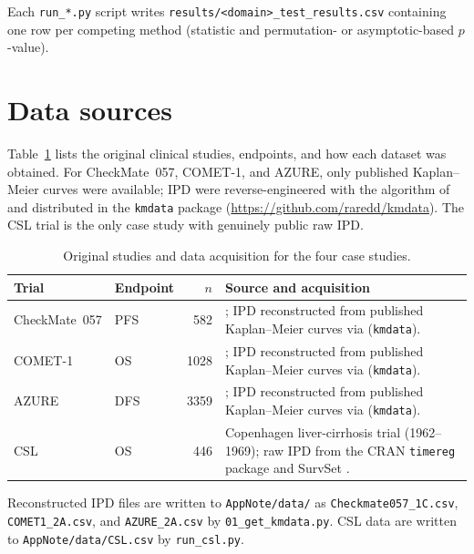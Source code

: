 \documentclass[11pt]{article}
\begin{document}
Each \texttt{run\_*.py} script writes
\texttt{results/<domain>\_test\_results.csv} containing one row per
competing method (statistic and permutation- or asymptotic-based
$p$-value).

\section{Data sources}

Table~\ref{tab:data} lists the original clinical studies, endpoints, and
how each dataset was obtained.  For CheckMate~057, COMET-1, and AZURE,
only published Kaplan--Meier curves were available; IPD were
reverse-engineered with the algorithm of \citet{guyot2012} and distributed
in the \texttt{kmdata} package (\url{https://github.com/raredd/kmdata}).
The CSL trial is the only case study with genuinely public raw IPD.

\begin{table}[h]
  \centering
  \caption{Original studies and data acquisition for the four case studies.}
  \label{tab:data}
  \small
  \begin{tabular}{@{}p{2.1cm}p{1.2cm}rp{4.6cm}@{}}
    \toprule
    Trial & Endpoint & $n$ & Source and acquisition \\
    \midrule
    CheckMate~057 &
      PFS & 582 &
      \citet{borghaei2015}; IPD reconstructed from published
      Kaplan--Meier curves via \citet{guyot2012} (\texttt{kmdata}). \\
    COMET-1 &
      OS & 1028 &
      \citet{smith2016}; IPD reconstructed from published
      Kaplan--Meier curves via \citet{guyot2012} (\texttt{kmdata}). \\
    AZURE &
      DFS & 3359 &
      \citet{coleman2011,coleman2014}; IPD reconstructed from published
      Kaplan--Meier curves via \citet{guyot2012} (\texttt{kmdata}). \\
    CSL &
      OS & 446 &
      Copenhagen liver-cirrhosis trial (1962--1969); raw IPD from the CRAN
      \texttt{timereg} package \citep{csl_data} and SurvSet
      \citep{survset2022}. \\
    \bottomrule
  \end{tabular}
\end{table}

\noindent
Reconstructed IPD files are written to \texttt{AppNote/data/} as
\texttt{Checkmate057\_1C.csv}, \texttt{COMET1\_2A.csv}, and
\texttt{AZURE\_2A.csv} by \texttt{01\_get\_kmdata.py}.
CSL data are written to \texttt{AppNote/data/CSL.csv} by
\texttt{run\_csl.py}.
\end{document}
